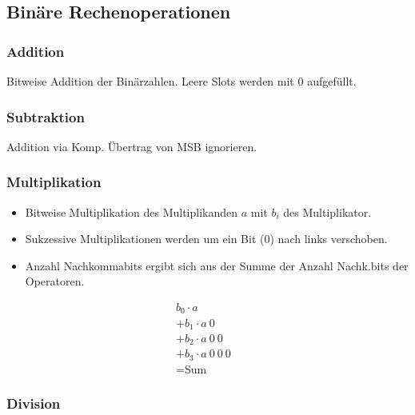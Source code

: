 \subsection{Binäre Rechenoperationen}
\begin{center}
    \begin{minipage}{0.45\linewidth}
        \subsubsection{Addition}
        Bitweise Addition der Binärzahlen. Leere Slots werden mit $0$ aufgefüllt.
    \end{minipage}
    \hfill
    \begin{minipage}{0.45\linewidth}
        \subsubsection{Subtraktion}
        Addition via \twocom Komp. Übertrag von MSB ignorieren.
    \end{minipage}
\end{center}
\subsubsection{Multiplikation}
\begin{center}
    \begin{minipage}{0.70\linewidth}
        \begin{itemize}
            \item Bitweise Multiplikation des Multiplikanden $a$ mit $b_i$ des Multiplikator.
            \item Sukzessive Multiplikationen werden um ein Bit ($0$) nach links verschoben.
            \item Anzahl Nachkommabits ergibt sich aus der Summe der Anzahl Nachk.bits der Operatoren.
        \end{itemize}
    \end{minipage}
    \hfill
    \begin{minipage}{0.25\linewidth}
        \begin{align*}
            b_0 \cdot a&\\
            +b_1 \cdot a~0\\
            +b_2 \cdot a~0~0&\\
            +b_3 \cdot a~0~0~0&\\
            \hline
            =\text{Sum}&
        \end{align*}
    \end{minipage}
\end{center}
\subsubsection{Division}
